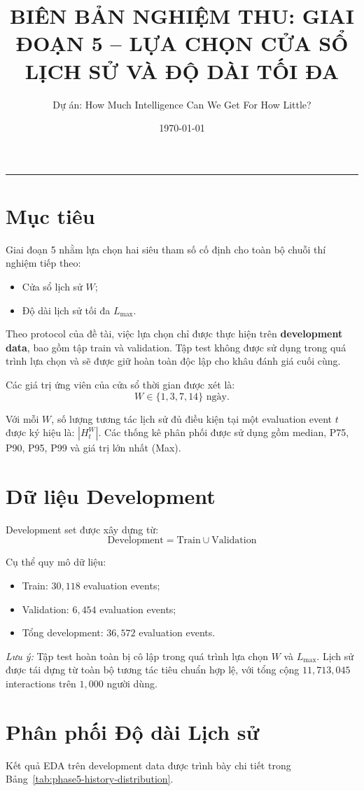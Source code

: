 \documentclass[12pt,a4paper]{article}
\title{\textbf{BIÊN BẢN NGHIỆM THU: GIAI ĐOẠN 5 -- LỰA CHỌN CỬA SỔ LỊCH SỬ VÀ ĐỘ DÀI TỐI ĐA}}
\author{Dự án: How Much Intelligence Can We Get For How Little?}
\date{\today}
\begin{document}
\maketitle
\hrule
\vspace{15pt}

\section{Mục tiêu}
Giai đoạn 5 nhằm lựa chọn hai siêu tham số cố định cho toàn bộ chuỗi thí nghiệm tiếp theo:
\begin{itemize}[noitemsep]
    \item Cửa sổ lịch sử $W$;
    \item Độ dài lịch sử tối đa $L_{\max}$.
\end{itemize}

Theo protocol của đề tài, việc lựa chọn chỉ được thực hiện trên \textbf{development data}, bao gồm tập train và validation. Tập test không được sử dụng trong quá trình lựa chọn và sẽ được giữ hoàn toàn độc lập cho khâu đánh giá cuối cùng.

Các giá trị ứng viên của cửa sổ thời gian được xét là:
\[
W \in \{1, 3, 7, 14\}\text{ ngày}.
\]

Với mỗi $W$, số lượng tương tác lịch sử đủ điều kiện tại một evaluation event $t$ được ký hiệu là: $|H_t^W|$. Các thống kê phân phối được sử dụng gồm median, P75, P90, P95, P99 và giá trị lớn nhất (Max).

\section{Dữ liệu Development}
Development set được xây dựng từ:
\[
\text{Development} = \text{Train} \cup \text{Validation}
\]

Cụ thể quy mô dữ liệu:
\begin{itemize}[noitemsep]
    \item Train: $30,118$ evaluation events;
    \item Validation: $6,454$ evaluation events;
    \item Tổng development: $36,572$ evaluation events.
\end{itemize}

\textit{Lưu ý:} Tập test hoàn toàn bị cô lập trong quá trình lựa chọn $W$ và $L_{\max}$. Lịch sử được tái dựng từ toàn bộ tương tác tiêu chuẩn hợp lệ, với tổng cộng $11,713,045$ interactions trên $1,000$ người dùng.

\section{Phân phối Độ dài Lịch sử}
Kết quả EDA trên development data được trình bày chi tiết trong Bảng~\ref{tab:phase5-history-distribution}.
\end{document}
